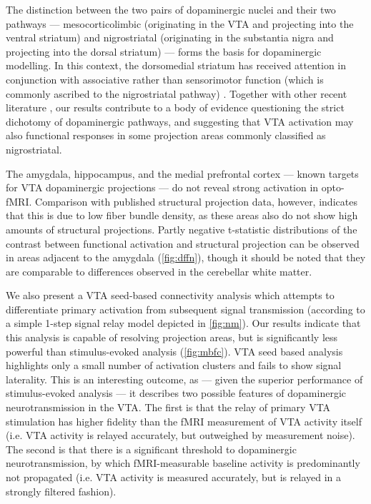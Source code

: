 The distinction between the two pairs of dopaminergic nuclei and their two pathways --- mesocorticolimbic (originating in the VTA and projecting into the ventral striatum) and nigrostriatal (originating in the substantia nigra and projecting into the dorsal striatum) --- forms the basis for dopaminergic modelling.
In this context, the dorsomedial striatum has received attention in conjunction with associative rather than sensorimotor function (which is commonly ascribed to the nigrostriatal pathway) \cite{Liljeholm2012,Yin2005}.
Together with other recent literature \cite{Lohani2016,Pan2010}, our results contribute to a body of evidence questioning the strict dichotomy of dopaminergic pathways, and suggesting that VTA activation may also functional responses in some projection areas commonly classified as nigrostriatal.

The amygdala, hippocampus, and the medial prefrontal cortex --- known targets for VTA dopaminergic projections --- do not reveal strong activation in opto-fMRI.
Comparison with published structural projection data, however, indicates that this is due to low fiber bundle density, as these areas also do not show high amounts of structural projections.
Partly negative t-statistic distributions of the contrast between functional activation and structural projection can be observed in areas adjacent to the amygdala (\cref{fig:dffn}), though it should be noted that they are comparable to differences observed in the cerebellar white matter.

We also present a VTA seed-based connectivity analysis which attempts to differentiate primary activation from subsequent signal transmission (according to a simple 1-step signal relay model depicted in \cref{fig:nm}).
Our results indicate that this analysis is capable of resolving projection areas, but is significantly less powerful than stimulus-evoked analysis (\cref{fig:mbfc}).
VTA seed based analysis highlights only a small number of activation clusters and fails to show signal laterality.
This is an interesting outcome, as --- given the superior performance of stimulus-evoked analysis --- it describes two possible features of dopaminergic neurotransmission in the VTA.
The first is that the relay of primary VTA stimulation has higher fidelity than the fMRI measurement of VTA activity itself (i.e. VTA activity is relayed accurately, but outweighed by measurement noise).
The second is that there is a significant threshold to dopaminergic neurotransmission, by which fMRI-measurable baseline activity is predominantly not propagated (i.e. VTA activity is measured accurately, but is relayed in a strongly filtered fashion).

